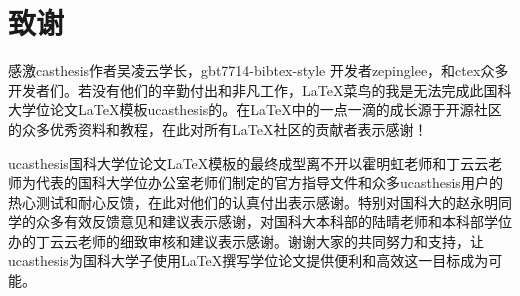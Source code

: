 \chapter*{致谢}%

感激casthesis作者吴凌云学长，gbt7714-bibtex-style
开发者zepinglee，和ctex众多开发者们。若没有他们的辛勤付出和非凡工作，\LaTeX{}菜鸟的我是无法完成此国科大学位论文\LaTeX{}模板ucasthesis的。在\LaTeX{}中的一点一滴的成长源于开源社区的众多优秀资料和教程，在此对所有\LaTeX{}社区的贡献者表示感谢！

ucasthesis国科大学位论文\LaTeX{}模板的最终成型离不开以霍明虹老师和丁云云老师为代表的国科大学位办公室老师们制定的官方指导文件和众多ucasthesis用户的热心测试和耐心反馈，在此对他们的认真付出表示感谢。特别对国科大的赵永明同学的众多有效反馈意见和建议表示感谢，对国科大本科部的陆晴老师和本科部学位办的丁云云老师的细致审核和建议表示感谢。谢谢大家的共同努力和支持，让ucasthesis为国科大学子使用\LaTeX{}撰写学位论文提供便利和高效这一目标成为可能。









